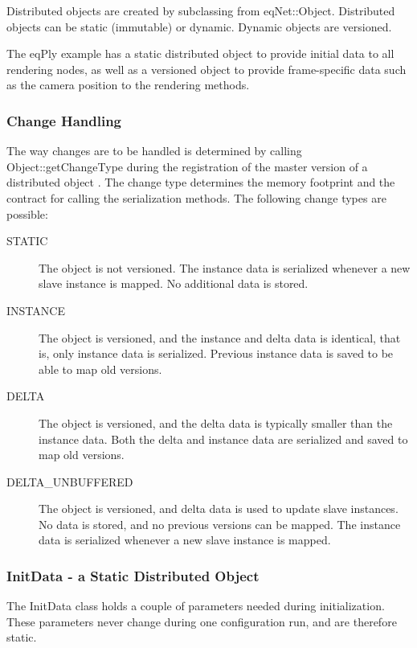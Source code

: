 \documentclass[10pt,a4]{scrartcl}
\begin{document}
Distributed objects are created by subclassing from
\textsf{eqNet::Object}. Distributed objects can be static (immutable) or
dynamic. Dynamic objects are versioned.

The \textsf{eqPly} example has a static distributed object to provide
initial data to all rendering nodes, as well as a versioned object to
provide frame-specific data such as the camera position to the
rendering methods.

\subsubsection{Change Handling}

The way changes are to be handled is determined by calling
\textsf{Object::getChangeType} during the registration of the master
version of a distributed object . The change type determines the memory
footprint and the contract for calling the serialization methods. The
following change types are possible:

\begin{description}
  \item[STATIC] The object is not versioned. The instance data is
    serialized whenever a new slave instance is mapped. No additional
    data is stored.
  \item[INSTANCE] The object is versioned, and the instance and delta
    data is identical, that is, only instance data is
    serialized. Previous instance data is saved to be able to map old
    versions.
  \item[DELTA] The object is versioned, and the delta data is typically
    smaller than the instance data. Both the delta and instance data are
    serialized and saved to map old versions.
  \item[DELTA\_UNBUFFERED] The object is versioned, and delta data is
    used to update slave instances. No data is stored, and no previous
    versions can be mapped. The instance data is serialized whenever a
    new slave instance is mapped.
\end{description}

\subsubsection{\label{sInitData}InitData - a Static Distributed Object}

The \textsf{InitData} class holds a couple of parameters needed during
initialization. These parameters never change during one configuration
run, and are therefore static.
\end{document}
